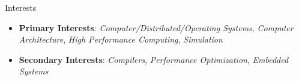 \begin{rSection}{Interests}
    \begin{itemize}
        \item \textbf{Primary Interests}: \textit{Computer/Distributed/Operating Systems}, \textit{Computer Architecture}, \textit{High Performance Computing}, \textit{Simulation}
        \item \textbf{Secondary Interests}: \textit{Compilers}, \textit{Performance Optimization}, \textit{Embedded Systems}
    \end{itemize}
\end{rSection}
\vspace*{-0.75\baselineskip}
